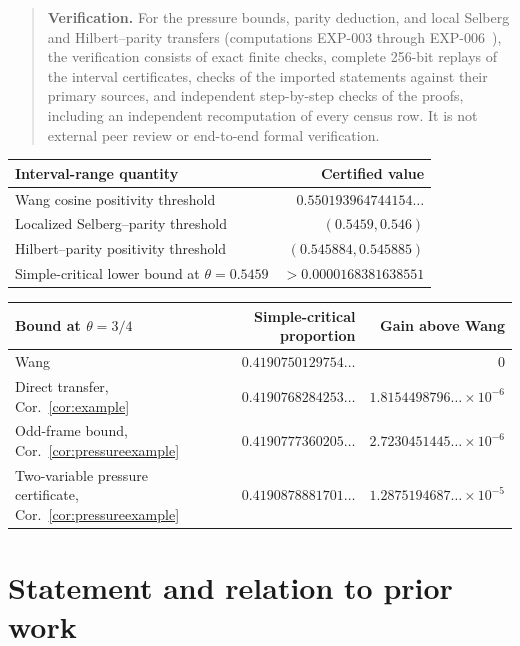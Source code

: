 \documentclass[11pt]{article}
\theoremstyle{remark}
\begin{document}
\begin{quote}\small
\textbf{Verification.} For the pressure bounds, parity deduction, and local
Selberg and Hilbert--parity transfers (computations EXP-003 through
EXP-006~\cite{RecordIII,RecordIV,RecordV,RecordVI}), the
verification consists of exact finite checks, complete 256-bit replays of
the interval certificates, checks of the imported statements against their
primary sources, and independent step-by-step checks of the proofs,
including an independent recomputation of every census row. It is not
external peer review or end-to-end formal verification.
\end{quote}

\begin{center}\small
\begin{tabular}{lr}
\toprule
Interval-range quantity & Certified value\\
\midrule
Wang cosine positivity threshold & $0.550193964744154\ldots$\\
Localized Selberg--parity threshold & $(0.5459,0.546)$\\
Hilbert--parity positivity threshold & $(0.545884,0.545885)$\\
Simple-critical lower bound at $\theta=0.5459$ & $>0.0000168381638551$\\
\bottomrule
\end{tabular}
\end{center}

\begin{center}\small
\begin{tabular}{lrr}
\toprule
Bound at $\theta=3/4$ & Simple-critical proportion & Gain above Wang\\
\midrule
Wang & $0.4190750129754\ldots$ & $0$\\
Direct transfer, Cor.~\ref{cor:example} & $0.4190768284253\ldots$ & $1.8154498796\ldots\times10^{-6}$\\
Odd-frame bound, Cor.~\ref{cor:pressureexample} & $0.4190777360205\ldots$ & $2.7230451445\ldots\times10^{-6}$\\
Two-variable pressure certificate, Cor.~\ref{cor:pressureexample} & $0.4190878881701\ldots$ & $1.2875194687\ldots\times10^{-5}$\\
\bottomrule
\end{tabular}
\end{center}

\section{Statement and relation to prior work}
\end{document}
